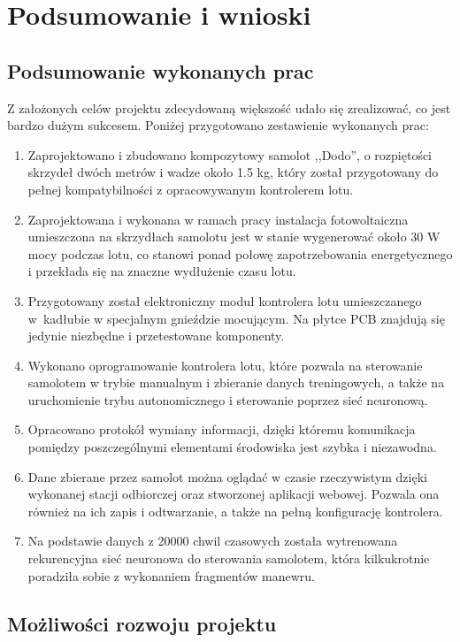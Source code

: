 \documentclass[12pt, a4paper]{article}
\begin{document}
\clearpage
\section{Podsumowanie i wnioski}

\subsection{Podsumowanie wykonanych prac}
Z założonych celów projektu zdecydowaną większość udało się zrealizować, co jest bardzo dużym sukcesem. Poniżej przygotowano zestawienie wykonanych prac:
\begin{enumerate}
\item Zaprojektowano i zbudowano kompozytowy samolot ,,Dodo'', o rozpiętości skrzydeł dwóch metrów i wadze około 1.5 kg, który został przygotowany do pełnej kompatybilności z opracowywanym kontrolerem lotu. 
\item Zaprojektowana i wykonana w ramach pracy instalacja fotowoltaiczna umieszczona na skrzydłach samolotu jest w stanie wygenerować około 30 W mocy podczas lotu, co stanowi ponad połowę zapotrzebowania energetycznego i przekłada się na znaczne wydłużenie czasu lotu.
\item Przygotowany został elektroniczny moduł kontrolera lotu umieszczanego w~kadłubie w specjalnym gnieździe mocującym. Na płytce PCB znajdują się jedynie niezbędne i przetestowane komponenty.
\item Wykonano oprogramowanie kontrolera lotu, które pozwala na sterowanie samolotem w trybie manualnym i zbieranie danych treningowych, a także na uruchomienie trybu autonomicznego i sterowanie poprzez sieć neuronową.
\item Opracowano protokół wymiany informacji, dzięki któremu komunikacja pomiędzy poszczególnymi elementami środowiska jest szybka i niezawodna.
\item Dane zbierane przez samolot można oglądać w czasie rzeczywistym dzięki wykonanej stacji odbiorczej oraz stworzonej aplikacji webowej. Pozwala ona również na ich zapis i odtwarzanie, a także na pełną konfigurację kontrolera.
\item Na podstawie danych z 20000 chwil czasowych została wytrenowana rekurencyjna sieć neuronowa do sterowania samolotem, która kilkukrotnie poradziła sobie z wykonaniem fragmentów manewru.

\end{enumerate}


\subsection{Możliwości rozwoju projektu}
\end{document}
